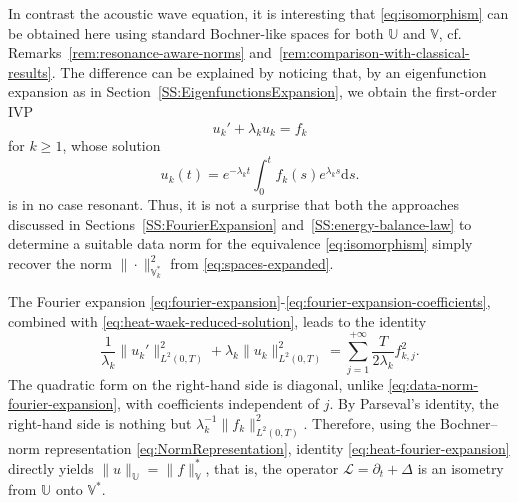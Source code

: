 \documentclass{amsart}
\theoremstyle{plain}
\theoremstyle{remark}
\numberwithin{equation}{section}
\numberwithin{theorem}{section}
\newcommand{\trial}{\mathbb{U}}
\newcommand{\test}{\mathbb{V}}
\newcommand{\data}{\mathbb{V}^*}
\begin{document}
In contrast the acoustic wave equation, it is interesting that  \eqref{eq:isomorphism} can be obtained here using standard Bochner-like spaces for both $\trial$ and $\test$, cf. Remarks~\ref{rem:resonance-aware-norms} and~\ref{rem:comparison-with-classical-results}. The difference can be explained by noticing that, by an eigenfunction expansion as in Section~\ref{SS:EigenfunctionsExpansion}, we obtain the first-order IVP
\begin{equation}
	\label{eq:heat-weak-reduced}
	u_k' +\lambda_k u_k = f_k
\end{equation}
for $k\geq 1$, whose solution
\begin{equation}
	\label{eq:heat-waek-reduced-solution}
	u_k(t) = e^{-\lambda_k t}\int_0^t f_k(s)e^{\lambda_k s}\mathrm{d}s.
\end{equation}
is in no case resonant. Thus, it is not a surprise that both the approaches discussed in Sections~\ref{SS:FourierExpansion} and~\ref{SS:energy-balance-law} to determine a suitable data norm for the equivalence \eqref{eq:isomorphism} simply recover the norm $\|\cdot\|^2_{\data_k}$ from \eqref{eq:spaces-expanded}.

The Fourier expansion \eqref{eq:fourier-expansion}-\eqref{eq:fourier-expansion-coefficients}, combined with \eqref{eq:heat-waek-reduced-solution}, leads to the identity
\begin{equation*}
	\label{eq:heat-fourier-expansion}
	\frac{1}{\lambda_k}\|u_k'\|^2_{L^2(0,T)} +  \lambda_k \|u_k\|^2_{L^2(0,T)} = \sum_{j=1}^{+\infty} \frac{T}{2\lambda_k} f_{k,j}^2.  
\end{equation*}
The quadratic form on the right-hand side is diagonal, unlike \eqref{eq:data-norm-fourier-expansion}, with coefficients independent of $j$. By Parseval's identity, the right-hand side is nothing but $\lambda_k^{-1}\|f_k\|^2_{L^2(0,T)}$. Therefore, using the Bochner–norm representation \eqref{eq:NormRepresentation}, 
identity \eqref{eq:heat-fourier-expansion} directly yields $\|u\|_\trial = \|f\|_\data$, that is, the operator $\mathcal L = \partial_t + \Delta$ is an isometry from 
$\trial$ onto $\data$.
\end{document}
